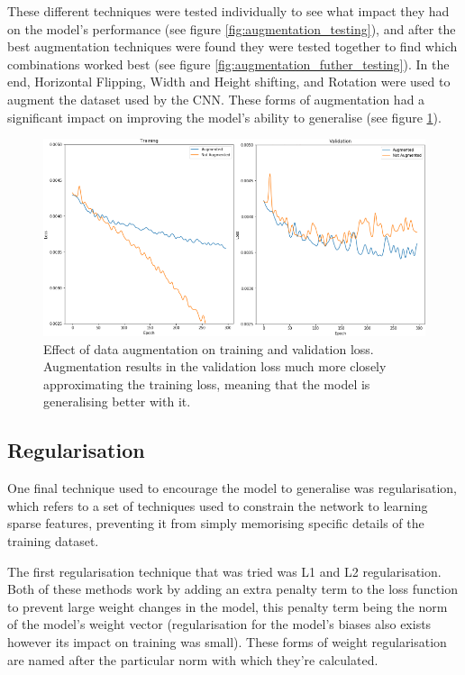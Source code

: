 \documentclass{l4proj}
\begin{document}
These different techniques were tested individually to see what impact they had on the model's performance (see figure \ref{fig:augmentation_testing}), and after the best augmentation techniques were found they were tested together to find which combinations worked best (see figure \ref{fig:augmentation_futher_testing}). In the end, Horizontal Flipping, Width and Height shifting, and Rotation were used to augment the dataset used by the CNN. These forms of augmentation had a significant impact on improving the model's ability to generalise (see figure \ref{fig:augmentation}).

\begin{figure}[H]
    \centering
    \includegraphics[width=0.9\linewidth]{images/Augmentation.PNG}    

    \caption{Effect of data augmentation on training and validation loss. Augmentation results in the validation loss much more closely approximating the training loss, meaning that the model is generalising better with it.}

    \label{fig:augmentation} 
\end{figure}

\subsection{Regularisation}
One final technique used to encourage the model to generalise was regularisation, which refers to a set of techniques used to constrain the network to learning sparse features, preventing it from simply memorising specific details of the training dataset. 

The first regularisation technique that was tried was L1 and L2 regularisation. Both of these methods work by adding an extra penalty term to the loss function to prevent large weight changes in the model, this penalty term being the norm of the model's weight vector (regularisation for the model's biases also exists however its impact on training was small). These forms of weight regularisation are named after the particular norm with which they're calculated. 
\end{document}
